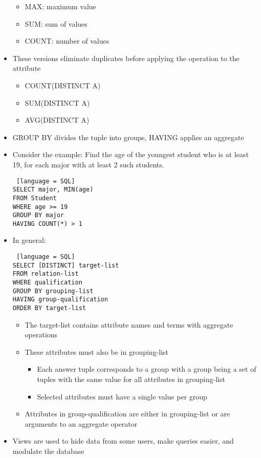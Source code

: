 \documentclass[8pt,landscape,a4paper, fleqn, dvipsnames]{extarticle}
\begin{document}
\begin{multicols*}{4}
\begin{itemize}
\begin{itemize}
        \item MAX: maximum value
        \item SUM: sum of values
        \item COUNT: number of values
    \end{itemize}
    \item These versions eliminate duplicates before applying the operation to the attribute
    \begin{itemize}
        \item COUNT(DISTINCT A)
        \item SUM(DISTINCT A)
        \item AVG(DISTINCT A)
    \end{itemize}
    \item GROUP BY divides the tuple into groups, HAVING applies an aggregate 
    \item Consider the example: Find the age of the youngest student who is at least 19, for each major with at least 2 such students.
    \begin{lstlisting} [language = SQL]
SELECT major, MIN(age)
FROM Student
WHERE age >= 19
GROUP BY major
HAVING COUNT(*) > 1
    \end{lstlisting}
    \item In general:
    \begin{lstlisting} [language = SQL]
SELECT [DISTINCT] target-list
FROM relation-list
WHERE qualification
GROUP BY grouping-list
HAVING group-qualification
ORDER BY target-list
    \end{lstlisting}
    \begin{itemize}
        \item The target-list contains attribute names and terms with aggregate operations
        \item These attributes must also be in grouping-list
        \begin{itemize}
            \item Each answer tuple corresponds to a group with a group being a set of tuples with the same value for all attributes in grouping-list
            \item Selected attributes must have a single value per group
        \end{itemize}
        \item Attributes in group-qualification are either in grouping-list or are arguments to an aggregate operator
    \end{itemize}
    \item Views are used to hide data from some users, make queries easier, and modulate the database

\end{itemize}
\end{multicols*}
\end{document}
